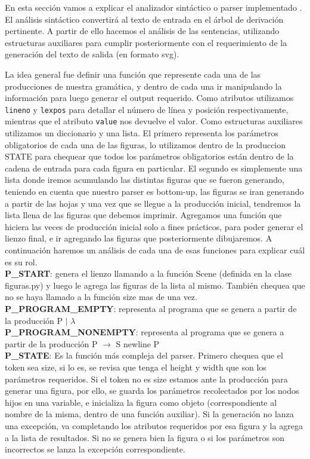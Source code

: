 En esta sección vamos a explicar el analizador sintáctico o parser implementado . El análisis sintáctico convertirá al texto de entrada
en el árbol de derivación pertinente. A partir de ello hacemos el análisis de las sentencias, utilizando estructuras auxiliares para
cumplir posteriormente con el requerimiento de la generación del texto de salida (en formato svg).

La idea general fue definir una función que represente cada una de las producciones de nuestra gramática, y dentro de cada una ir manipulando la
información para luego generar el output requerido.
Como atributos utilizamos \texttt{lineno} y \texttt{lexpos} para detallar el número de línea y posición respectivamente, mientras que el atributo \texttt{value} nos devuelve el valor.
Como estructuras auxiliares utilizamos un diccionario y una lista. El primero representa los parámetros obligatorios de cada una de las
figuras, lo utilizamos dentro de la produccion STATE para chequear que todos los parámetros obligatorios están dentro de la cadena de entrada
para cada figura en particular. El segundo es simplemente una lista donde iremos acumulando las distintas figuras que se fueron generando, teniendo
en cuenta que nuestro parser es bottom-up, las figuras se iran generando a partir de las hojas y una vez que se llegue a la producción inicial, tendremos
la lista llena de las figuras que debemos imprimir.
Agregamos una función que hiciera las veces de producción inicial solo a fines prácticos, para poder generar el lienzo final, e ir
agregando las figuras que posteriormente dibujaremos.
A continuación haremos un análisis de cada una de esas funciones para explicar cuál es su rol.\\

\textbf{P_START}: genera el lienzo llamando a la función Scene (definida en la clase figuras.py) y luego le agrega las figuras de la lista al mismo.
También chequea que no se haya llamado a la función size mas de una vez.\\

\textbf{P_PROGRAM_EMPTY}: representa al programa que se genera a partir de la producción P $\mid$ $\lambda$\\

\textbf{P_PROGRAM_NONEMPTY}: representa al programa que se genera a partir de la producción P $\rightarrow$ S newline P\\

\textbf{P_STATE}: Es la función más compleja del parser. Primero chequea que el token sea size, si lo es, se revisa que tenga el height y width que son los parámetros requeridos.
Si el token no es size estamos ante la producción para generar una figura, por ello, se guarda los parámetros recolectados por los nodos hijos en una variable,
 e inicializa la figura como objeto (correspondiente al nombre de la misma, dentro de una función auxiliar).
Si la generación no lanza una excepción, va completando los atributos requeridos por esa figura y la agrega a la lista de resultados. Si no se genera bien la figura o si
los parámetros son incorrectos se lanza la excepción correspondiente.\\


